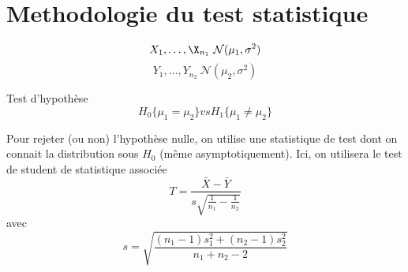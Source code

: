 
\section{Methodologie du test statistique}

\begin{equation}
X_1,\ldots,\X_{n_1} ~\mathcal{N}(\mu_1,\sigma^2)
\end{equation}
\begin{equation}
Y_1,\ldots,Y_{n_2} ~\mathcal{N}(\mu_2,\sigma^2)
\end{equation}

Test d'hypoth\`ese
\begin{equation}
H_0 \{\mu_1=\mu_2\} vs H_1 \{\mu_1\neq\mu_2\}
\end{equation}

Pour rejeter (ou non) l'hypoth\`ese nulle, on utilise une statistique de test dont on connait la distribution sous $H_0$ (m\^eme asymptotiquement).
Ici, on utilisera le test de student de statistique associ\'ee
\begin{equation}
T=\frac{\bar{X}-\bar{Y}}{s\sqrt{\frac{1}{n_1}-\frac{1}{n_2}}}
\end{equation}
avec
\begin{equation}
s=\sqrt{\frac{(n_1-1)s_1^2+(n_2-1)s_2^2}{n_1+n_2-2}}
\end{equation}
